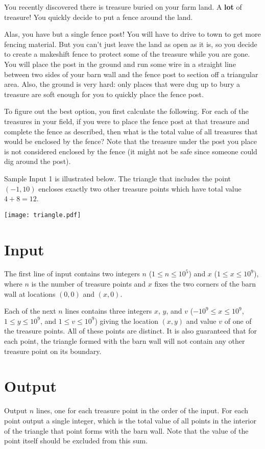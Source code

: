 
You recently discovered there is treasure buried on your farm land. A {\bf lot} of treasure! You quickly decide to put a fence around the land.

Alas, you have but a single fence post! You will have to drive to town to get more fencing material. But you can't just leave the land as open as it is, so you decide to create a makeshift fence to protect some of the treasure while you are gone. You will place the post in the ground and run some wire in a straight line between two sides of your barn wall and the fence post to section off a triangular area. Also, the ground is very hard: only places that were dug up to bury a treasure are soft enough for you to quickly place the fence post.

To figure out the best option, you first calculate the following. For each of the treasures in your field, if you were to place the fence post at that treasure and complete the fence as described, then what is the total value of all treasures that would be enclosed by the fence? Note that the treasure under the post you place is not considered enclosed by the fence (it might not be safe since someone could dig around the post).

Sample Input 1 is illustrated below. The triangle that includes the point $(-1,10)$ encloses exactly two other treasure points which have total value $4+8=12$.
\begin{center}
  \texttt{[image: triangle.pdf]}
\end{center}

\section*{Input}
The first line of input contains two integers $n$ ($1 \leq n \leq 10^5$) and $x$
($1 \leq x \leq 10^9$), where $n$ is the number of treasure points and
$x$ fixes the two corners of the barn wall at locations $(0,0)$
and $(x,0)$.

Each of the next $n$ lines contains three integers $x$, $y$, and $v$ ($-10^9 \leq x \leq 10^9$, $1 \leq y \leq 10^9$, and $1 \leq v \leq 10^9$) giving the location $(x,y)$ and value $v$ of one of the treasure points. All of these points are distinct. It is also guaranteed that for each point, the triangle formed with the barn wall will not contain any other treasure point on its boundary.

\section*{Output}
Output $n$ lines, one for each treasure point in the order of the input. For each point output a single integer, which is the total value of all points in the interior of the triangle that point forms with the barn wall. Note that the value of the point itself should be excluded from this sum.
